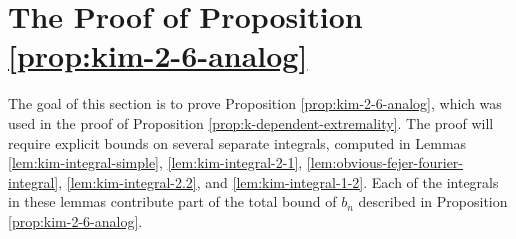 \documentclass[11pt,letterpaper,reqno]{amsart}
\theoremstyle{definition}
\numberwithin{equation}{section}
\numberwithin{figure}{section}
\numberwithin{table}{section}
\begin{document}
\section{The Proof of Proposition \ref{prop:kim-2-6-analog}}\label{subsection:integral-bounds}

The goal of this section is to prove Proposition \ref{prop:kim-2-6-analog}, which was used in the proof of Proposition \ref{prop:k-dependent-extremality}. The proof will require explicit bounds on several separate integrals, computed in Lemmas \ref{lem:kim-integral-simple}, \ref{lem:kim-integral-2-1}, \ref{lem:obvious-fejer-fourier-integral}, \ref{lem:kim-integral-2.2}, and \ref{lem:kim-integral-1-2}. Each of the integrals in these lemmas contribute part of the total bound of $b_n$ described in  Proposition \ref{prop:kim-2-6-analog}.
\end{document}
